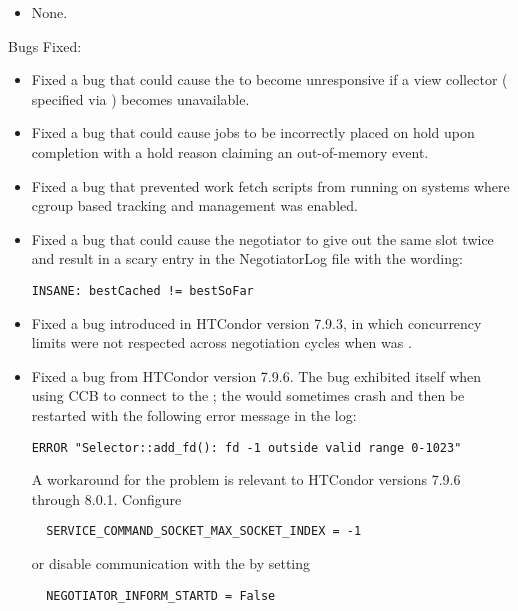 \begin{itemize}

\item None.

\end{itemize}

\noindent Bugs Fixed:

\begin{itemize}

\item Fixed a bug that could cause the  to 
	become unresponsive if a view collector ( specified 
	via  ) becomes unavailable.

\item Fixed a bug that could cause jobs to be incorrectly placed on hold upon
	completion with a hold reason claiming an out-of-memory event.

\item Fixed a bug that prevented work fetch scripts from running
on systems where cgroup based tracking and management was enabled.

\item Fixed a bug that could cause the negotiator to give out the same
	slot twice and result in a scary entry in the NegotiatorLog file with the 
	wording:
\begin{verbatim}
INSANE: bestCached != bestSoFar
\end{verbatim}

\item Fixed a bug introduced in HTCondor version 7.9.3,
in which concurrency limits were not respected across negotiation cycles when
 was .

\item Fixed a bug from HTCondor version 7.9.6. 
The bug exhibited itself when using CCB to connect to the ;
the  would sometimes crash and then be restarted
with the following error message in the log:

\begin{verbatim}
ERROR "Selector::add_fd(): fd -1 outside valid range 0-1023"
\end{verbatim}

A workaround for the problem is relevant to HTCondor versions 7.9.6 through
8.0.1. Configure
\begin{verbatim}
  SERVICE_COMMAND_SOCKET_MAX_SOCKET_INDEX = -1
\end{verbatim}
or disable communication with the  by setting
\begin{verbatim}
  NEGOTIATOR_INFORM_STARTD = False
\end{verbatim}


\end{itemize}
